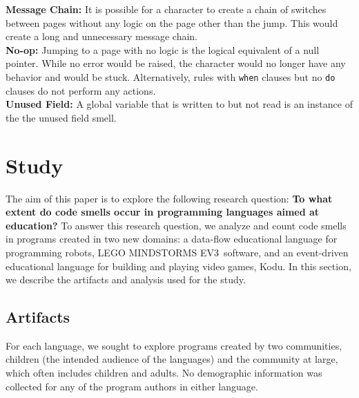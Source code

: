\documentclass[conference]{IEEEtran}
\newcommand{\ms}{LEGO MINDSTORMS EV3}
\begin{document}
\textbf{Message Chain:} It is possible for a character to create a chain of switches between pages without any logic on the page other than the jump. This would create a long and unnecessary message chain. \\
\textbf{No-op:} Jumping to a page with no logic is the logical equivalent of a null pointer. While no error would be raised, the character would no longer have any behavior and would be stuck. Alternatively, rules with {\tt when} clauses but no {\tt do} clauses do not perform any actions. \\
\textbf{Unused Field:} A global variable that is written to but not read is an instance of the the unused field smell. \\



\section{Study}
\label{sec:study}
The aim of this paper is to explore the following research question: \textbf{To what extent do code smells occur in programming languages aimed at education?} 
%
To answer this research question, we analyze and count code smells in programs created in two new domains: a data-flow educational language for programming robots, \ms~software,  and an event-driven educational language for building and playing video games, Kodu. 
In this section, we describe the artifacts and analysis used for the study. 

\subsection{Artifacts}
For each language, we sought to explore programs created by two communities, children (the intended audience of the languages) and the community at large, which often includes children and adults. No demographic information was collected for any of the program authors in either language. 
\end{document}
